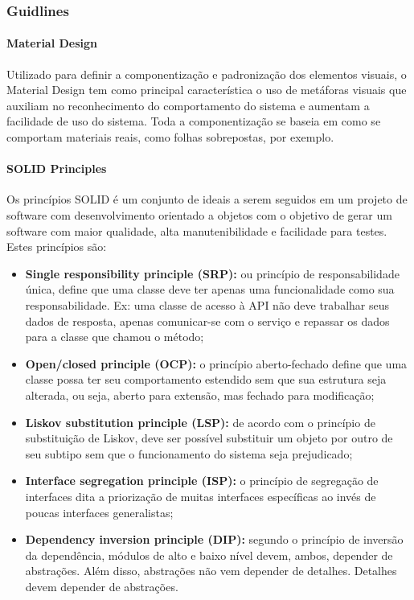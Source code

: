 \documentclass[	DIV=calc,%
							paper=a4,%
							fontsize=12pt,%
							onecolumn]{scrartcl}	 					%
\begin{document}
\subsubsection{Guidlines} 
\paragraph{Material Design}
Utilizado para definir a componentização e padronização dos elementos visuais, o Material Design\cite{materiald} tem como principal característica o uso de metáforas visuais que auxiliam no reconhecimento do comportamento do sistema e aumentam a facilidade de uso do sistema. Toda a componentização se baseia em como se comportam materiais reais, como folhas sobrepostas, por exemplo.

\paragraph{SOLID Principles}
Os princípios SOLID\cite{solid} é um conjunto de ideais a serem seguidos em um projeto de software com desenvolvimento orientado a objetos com o objetivo de gerar um software com maior qualidade, alta manutenibilidade e facilidade para testes. Estes princípios são:
\begin{itemize}
	\item \textbf{Single responsibility principle (SRP):} ou princípio de responsabilidade única, define que uma classe deve ter apenas uma funcionalidade como sua responsabilidade. Ex: uma classe de acesso à API não deve trabalhar seus dados de resposta, apenas comunicar-se com o serviço e repassar os dados para a classe que chamou o método;
	\item \textbf{Open/closed principle (OCP):} o princípio aberto-fechado define que uma classe possa ter seu comportamento estendido sem que sua estrutura seja alterada, ou seja, aberto para extensão, mas fechado para modificação;
	\item \textbf{Liskov substitution principle (LSP):} de acordo com o princípio de substituição de Liskov, deve ser possível substituir um objeto por outro de seu subtipo sem que o funcionamento do sistema seja prejudicado;
	\item \textbf{Interface segregation principle (ISP):} o princípio de segregação de interfaces dita a priorização de muitas interfaces específicas ao invés de poucas interfaces generalistas;
	\item \textbf{Dependency inversion principle (DIP):} segundo o princípio de inversão da dependência, módulos de alto e baixo nível devem, ambos, depender de abstrações. Além disso, abstrações não vem depender de detalhes. Detalhes devem depender de abstrações.
\end{itemize}
\end{document}
